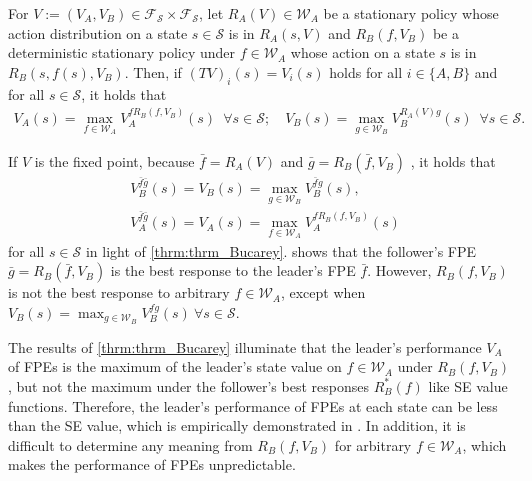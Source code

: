 \documentclass{acml}
\providecommand{\x}{\times}
\begin{document}
\begin{theorem}\label{thrm:thrm_Bucarey}
	For $V:=(V_A,V_B)\in\mathcal{F}_{\mathcal{S}}\x\mathcal{F}_{\mathcal{S}}$, let $R_A(V)\in\mathcal{W}_A$ be a stationary policy whose action distribution on a state $s\in\mathcal{S}$ is in $R_A(s,V)$ and $R_B(f,V_B)$ be a deterministic stationary policy under $f\in\mathcal{W}_A$ whose action on a state $s$ is in $R_B(s,f(s),V_B)$.
	Then, if $(TV)_i(s)=V_i(s)$ holds for all $i\in\{A,B\}$ and for all $s\in\mathcal{S}$, it holds that
	\begin{align*}
		V_A(s)=\max_{f\in\mathcal{W}_A}V_A^{fR_B(f,V_B)}(s)\enspace\forall s\in\mathcal{S};\quad
		V_B(s)=\max_{g\in\mathcal{W}_B}V_B^{R_A(V)g}(s)\enspace\forall s\in\mathcal{S}.
	\end{align*}
\end{theorem}
If $V$ is the fixed point, because $\bar{f}=R_A(V)$ and $\bar{g}=R_B(\bar{f},V_B)$ , it holds that
\begin{align}
	&V_B^{\bar{f}\bar{g}}(s)=V_B(s)=\max_{g\in\mathcal{W}_B}V_B^{\bar{f}g}(s),\label{eq:Bucarey_FPE_value_B}\\
	&V_A^{\bar{f}\bar{g}}(s)=V_A(s)=\max_{f\in\mathcal{W}_A}V_A^{fR_B(f,V_B)}(s)\label{eq:Bucarey_FPE_value_A}
\end{align}
for all $s\in\mathcal{S}$ in light of \cref{thrm:thrm_Bucarey}.
 shows that the follower's FPE $\bar{g}=R_B(\bar{f},V_B)$ is the best response to the leader's FPE $\bar{f}$.
However, $R_B(f,V_B)$ is not the best response to arbitrary $f\in\mathcal{W}_A$, except when $V_B(s)=\max_{g\in\mathcal{W}_B}V_B^{fg}(s)~\forall s\in\mathcal{S}$.

The results of \cref{thrm:thrm_Bucarey} illuminate that the leader's performance $V_A$ of FPEs is the maximum of the leader's state value on $f\in\mathcal{W}_A$ under $R_B(f,V_B)$, but not the maximum under the follower's best responses $R_B^*(f)$ like SE value functions.
Therefore, the leader's performance of FPEs at each state can be less than the SE value, which is empirically demonstrated in \citet{Bucarey2019-bf}.
In addition, it is difficult to determine any meaning from $R_B(f,V_B)$ for arbitrary $f\in\mathcal{W}_A$, which makes the performance of FPEs unpredictable.
\end{document}
